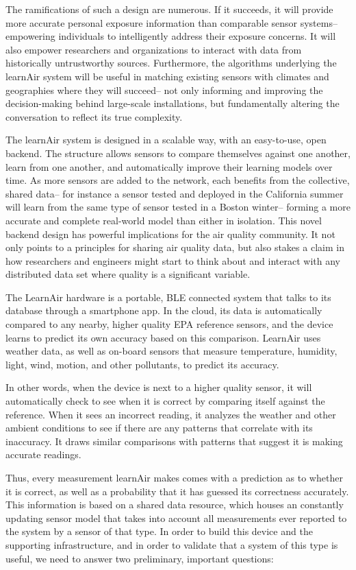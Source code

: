 The ramifications of such a design are numerous. If it succeeds, it will provide more accurate personal exposure information than comparable sensor systems-- empowering individuals to intelligently address their exposure concerns.  It will also empower researchers and organizations to interact with data from historically untrustworthy sources.  Furthermore, the algorithms underlying the learnAir system will be useful in matching existing sensors with climates and geographies where they will succeed-- not only informing and improving the decision-making behind large-scale installations, but fundamentally altering the conversation to reflect its true complexity.  

The learnAir system is designed in a scalable way, with an easy-to-use, open backend.  The structure allows sensors to compare themselves against one another, learn from one another, and automatically improve their learning models over time.  As more sensors are added to the network, each benefits from the collective, shared data-- for instance a sensor tested and deployed in the California summer will learn from the same type of sensor tested in a Boston winter-- forming a more accurate and complete real-world model than either in isolation.  This novel backend design has powerful implications for the air quality community.  It not only points to a principles for sharing air quality data, but also stakes a claim in how researchers and engineers might start to think about and interact with any distributed data set where quality is a significant variable.
 
The LearnAir hardware is a portable, BLE connected system that talks to its database through a smartphone app.  In the cloud, its data is automatically compared to any nearby, higher quality EPA reference sensors, and the device learns to predict its own accuracy based on this comparison.  LearnAir uses weather data, as well as on-board sensors that measure temperature, humidity, light, wind, motion, and other pollutants, to predict its accuracy.  

In other words, when the device is next to a higher quality sensor, it will automatically check to see when it is correct by comparing itself against the reference.  When it sees an incorrect reading, it analyzes the weather and other ambient conditions to see if there are any patterns that correlate with its inaccuracy.  It draws similar comparisons with patterns that suggest it is making accurate readings.

Thus, every measurement learnAir makes comes with a prediction as to whether it is correct, as well as a probability that it has guessed its correctness accurately.  This information is based on a shared data resource, which houses an constantly updating sensor model that takes into account all measurements ever reported to the system by a sensor of that type.   In order to build this device and the supporting infrastructure, and in order to validate that a system of this type is useful, we need to answer two preliminary, important questions:  

